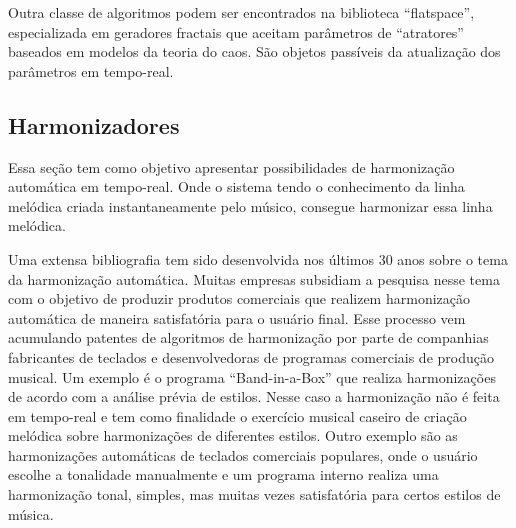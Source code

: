 \documentclass[draft]{ppgmus}
\begin{document}
Outra classe de algoritmos podem ser encontrados na biblioteca ``flatspace'', especializada
em geradores fractais que aceitam parâmetros de ``atratores'' baseados em modelos da teoria
do caos. São objetos passíveis da atualização dos parâmetros em tempo-real. 
% 




\subsection{Harmonizadores}


Essa seção tem como objetivo apresentar possibilidades de harmonização automática em tempo-real.
Onde o sistema tendo o conhecimento da linha melódica criada instantaneamente pelo músico, consegue
harmonizar essa linha melódica.

Uma extensa bibliografia tem sido desenvolvida nos últimos 30 anos sobre o tema da harmonização automática.
Muitas empresas subsidiam a pesquisa nesse tema com o objetivo de produzir produtos comerciais que realizem
harmonização automática de maneira satisfatória para o usuário final. Esse processo vem acumulando patentes
de algoritmos de harmonização por parte de companhias fabricantes de teclados e desenvolvedoras de programas comerciais
de produção musical. Um exemplo é o programa ``Band-in-a-Box'' que realiza harmonizações de acordo com
a análise prévia de estilos. Nesse caso a harmonização não é feita em tempo-real e tem como finalidade
o exercício musical caseiro de criação melódica sobre harmonizações de diferentes estilos.
Outro exemplo são as harmonizações automáticas de teclados comerciais populares, onde o usuário escolhe
a tonalidade manualmente e um programa interno realiza uma harmonização tonal, simples, mas muitas vezes 
satisfatória para certos estilos de música.
\end{document}
